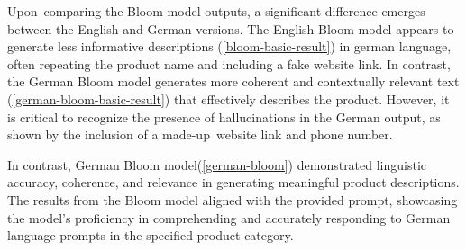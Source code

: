 Upon comparing the Bloom model outputs, a significant difference emerges between the English and German versions. The English Bloom model appears to generate less informative descriptions (\autoref{bloom-basic-result}) in german language, often repeating the product name and including a fake website link. In contrast, the German Bloom model generates more coherent and contextually relevant text (\autoref{german-bloom-basic-result}) that effectively describes the product. However, it is critical to recognize the presence of hallucinations in the German output, as shown by the inclusion of a made-up website link and phone number. 

\begin{center}
	\par
\end{center}


\begin{center}
	\par
	
\end{center}

In contrast, German Bloom model(\autoref{german-bloom}) demonstrated linguistic accuracy, coherence, and relevance in generating meaningful product descriptions. The results from the Bloom model aligned with the provided prompt, showcasing the model's proficiency in comprehending and accurately responding to German language prompts in the specified product category.



